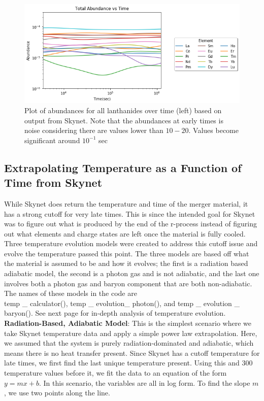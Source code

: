 \documentclass[11pt,a4paper]{article}
\begin{document}
\begin{figure}[h!]
  \includegraphics[scale = .65]{elemental.png}
  \centering
  \caption{Plot of abundances for all lanthanides over time (left) based on output from Skynet. Note that the abundances at early times is noise considering there are values lower than $10-20$. Values become significant around $10^{-1}$ sec}
\end{figure} 


\subsection{Extrapolating Temperature as a Function of Time from Skynet}

While Skynet does return the temperature and time of the merger material, it has a strong cutoff for very late times. This is since the intended goal for Skynet was to figure out what is produced by the end of the r-process instead of figuring out what elements and charge states are left once the material is fully cooled. Three temperature evolution models were created to address this cutoff issue and evolve the temperature passed this point. The three models are based off what the material is assumed to be and how it evolves; the first is a radiation based adiabatic model, the second is a photon gas and is not adiabatic, and the last one involves both a photon gas and baryon component that are both non-adiabatic. The names of these models in the code are \\ temp \_ calculator(),  temp \_ evolution\_ photon(), and temp \_ evolution \_ baryon(). See next page for in-depth analysis of temperature evolution. \\ 


\textbf{Radiation-Based, Adiabatic Model}: This is the simplest scenario where we take Skynet temperature data and apply a simple power law extrapolation. Here, we assumed that the system is purely radiation-dominated and adiabatic, which means there is no heat transfer present. Since Skynet has a cutoff temperature for late times, we first find the last unique temperature present. Using this and 300 temperature values before it, we fit the data to an equation of the form $y = mx + b$. In this scenario, the variables are all in log form. To find the slope $m$, we use two points along the line.
\end{document}
